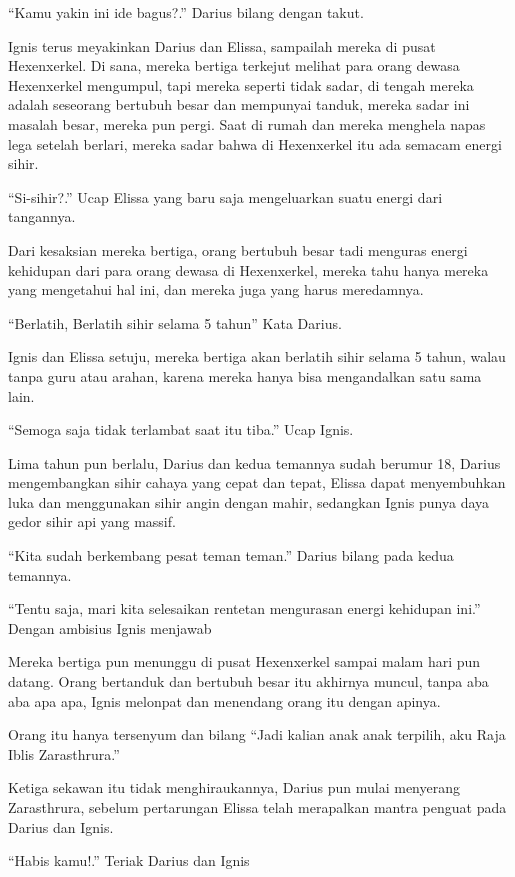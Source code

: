 ``Kamu yakin ini ide bagus?.'' Darius bilang dengan takut.


Ignis terus meyakinkan Darius dan Elissa, sampailah mereka di pusat Hexenxerkel. Di sana, mereka bertiga terkejut melihat para orang dewasa Hexenxerkel mengumpul, tapi mereka seperti tidak sadar, di tengah mereka adalah seseorang bertubuh besar dan mempunyai tanduk, mereka sadar ini masalah besar, mereka pun pergi. Saat di rumah dan mereka menghela napas lega setelah berlari, mereka sadar bahwa di Hexenxerkel itu ada semacam energi sihir.


``Si-sihir?.'' Ucap Elissa yang baru saja mengeluarkan suatu energi dari tangannya.


Dari kesaksian mereka bertiga, orang bertubuh besar tadi menguras energi kehidupan dari para orang dewasa di Hexenxerkel, mereka tahu hanya mereka yang mengetahui hal ini, dan mereka juga yang harus meredamnya.


``Berlatih, Berlatih sihir selama 5 tahun'' Kata Darius.


Ignis dan Elissa setuju, mereka bertiga akan berlatih sihir selama 5 tahun, walau tanpa guru atau arahan, karena mereka hanya bisa mengandalkan satu sama lain.


``Semoga saja tidak terlambat saat itu tiba.'' Ucap Ignis.


Lima tahun pun berlalu, Darius dan kedua temannya sudah berumur 18, Darius mengembangkan sihir cahaya yang cepat dan tepat, Elissa dapat menyembuhkan luka dan menggunakan sihir angin dengan mahir, sedangkan Ignis punya daya gedor sihir api yang massif.


``Kita sudah berkembang pesat teman teman.'' Darius bilang pada kedua temannya.


``Tentu saja, mari kita selesaikan rentetan mengurasan energi kehidupan ini.'' Dengan ambisius Ignis menjawab


Mereka bertiga pun menunggu di pusat Hexenxerkel sampai malam hari pun datang. Orang bertanduk dan bertubuh besar itu akhirnya muncul, tanpa aba aba apa apa, Ignis melonpat dan menendang orang itu dengan apinya.


Orang itu hanya tersenyum dan bilang ``Jadi kalian anak anak terpilih, aku Raja Iblis Zarasthrura.''


Ketiga sekawan itu tidak menghiraukannya, Darius pun mulai menyerang Zarasthrura, sebelum pertarungan Elissa telah merapalkan mantra penguat pada Darius dan Ignis.


``Habis kamu!.'' Teriak Darius dan Ignis


